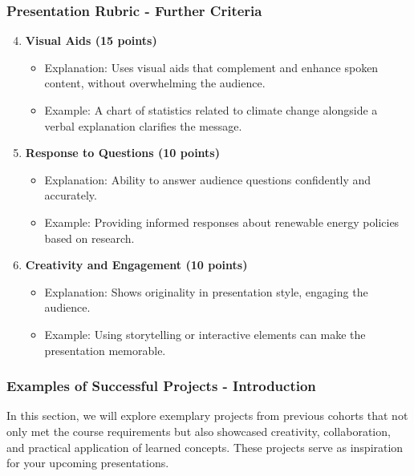 \documentclass[aspectratio=169]{beamer}
\begin{document}
\begin{frame}[fragile]
    \frametitle{Presentation Rubric - Further Criteria}
    \begin{enumerate}
        \setcounter{enumi}{3}
        \item \textbf{Visual Aids (15 points)}
            \begin{itemize}
                \item Explanation: Uses visual aids that complement and enhance spoken content, without overwhelming the audience.
                \item Example: A chart of statistics related to climate change alongside a verbal explanation clarifies the message.
            \end{itemize}
        
        \item \textbf{Response to Questions (10 points)}
            \begin{itemize}
                \item Explanation: Ability to answer audience questions confidently and accurately.
                \item Example: Providing informed responses about renewable energy policies based on research.
            \end{itemize}

        \item \textbf{Creativity and Engagement (10 points)}
            \begin{itemize}
                \item Explanation: Shows originality in presentation style, engaging the audience.
                \item Example: Using storytelling or interactive elements can make the presentation memorable.
            \end{itemize}
    \end{enumerate}
\end{frame}

\begin{frame}[fragile]
    \frametitle{Examples of Successful Projects - Introduction}
    In this section, we will explore exemplary projects from previous cohorts that not only met the course requirements but also showcased creativity, collaboration, and practical application of learned concepts. These projects serve as inspiration for your upcoming presentations.
\end{frame}
\end{document}
